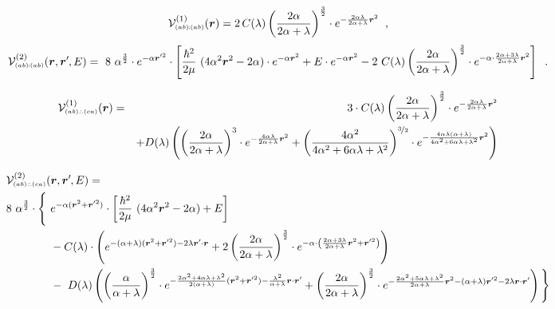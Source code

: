 \documentclass[onecolumn,preprint,superscriptaddress,nofootinbib,notitlepage,10pt,linenumbers]{revtex4-1}
\newcommand*{\mprime}{^{\prime}\mkern-1.2mu}
\newcommand{\la}{\label}
\newcommand{\be}{\begin{equation}}
\newcommand{\ee}{\end{equation}}
\newcommand{\ve}[1]{\ensuremath{\boldsymbol{#1}}}
\newcommand{\cc}{\ensuremath C(\lambda)}
\newcommand{\dd}{\ensuremath D(\lambda)}
\newcommand{\abab}{\ensuremath $(ab)\!\!:\!\!(ab)$}
\newcommand{\abca}{\ensuremath $(ab)\wasytherefore(ca)$}
\begin{document}
\begin{description}
	\item[\abab]
\be\la{eq.local.abab}
\mathcal{V}^{(1)}_{\text{\tiny\abab}}(\ve{r})=
2\,\cc\left(\frac{2\alpha}{2\alpha+\lambda}\right)^{\frac{3}{2}}\cdot
 e^{-\frac{2\alpha\lambda}{2\alpha+\lambda}\ve{r}^2}\;\;,
\ee
\be\la{eq.nonlocal.abab}
\mathcal{V}^{(2)}_{\text{\tiny\abab}}(\ve{r},\ve{r}\mprime,E)=
~8~\alpha^{\frac{3}{2}}\cdot e^{-\alpha\ve{r}\mprime^2}\cdot
\left[\frac{\hbar^2}{2\mu}~(4\alpha^2\ve{r}^2-2\alpha)
\cdot e^{-\alpha\ve{r}^2}+
E\cdot e^{-\alpha\ve{r}^2}
-2~\cc\left(\frac{2\alpha}{2\alpha+\lambda}\right)^{\frac{3}{2}}\cdot
 e^{-\alpha\cdot\frac{2\alpha+3\lambda}{2\alpha+\lambda}\ve{r}^2}\right]\;\;.
\ee

\item[\abca]
\begin{eqnarray}\la{eq.local.abca}
\mathcal{V}^{(1)}_{\text{\tiny\abca}}(\ve{r})&=&
3\cdot \cc\left(\frac{2\alpha}{2\alpha+\lambda}\right)^{\frac{3}{2}}\cdot
 e^{-\frac{2\alpha\lambda}{2\alpha+\lambda}\ve{r}^2}\\
&&+\dd\left(
\left(\frac{2\alpha}{2\alpha+\lambda}\right)^{3}\cdot e^{-\frac{4\alpha\lambda}{2\alpha+\lambda}\ve{r}^2}+
\left(\frac{4\alpha^2}{4\alpha^2+6\alpha\lambda+\lambda^2}\right)^{\nicefrac{3}{2}}\cdot
 e^{-\frac{4\alpha\lambda(\alpha+\lambda)}{4\alpha^2+6\alpha\lambda+\lambda^2}\ve{r}^2}
\right)
\end{eqnarray}


\begin{align}
\multispan2{$\displaystyle \mathcal{V}^{(2)}_{\text{\tiny\abca}}(\ve{r},\ve{r}\mprime,E)=$\hfil}\\
8~\alpha^{\frac{3}{2}}\cdot\Bigg\lbrace&~
e^{-\alpha(\ve{r}^2+\ve{r}\mprime^2)}\cdot
\left[\frac{\hbar^2}{2\mu}~(4\alpha^2\ve{r}^2-2\alpha)+
E\right]\\
&~-\cc\cdot\left(
 e^{-(\alpha+\lambda)(\ve{r}^2+\ve{r}\mprime^2)-2\lambda\ve{r}\mprime\cdot\ve{r}}
+2\left(\frac{2\alpha}{2\alpha+\lambda}\right)^{\frac{3}{2}}\cdot
 e^{-\alpha\cdot\left(\frac{2\alpha+3\lambda}{2\alpha+\lambda}\ve{r}^2+\ve{r}\mprime^2\right)}\right)\\
&~-~\dd\left(\left(\frac{\alpha}{\alpha+\lambda}\right)^{\frac{3}{2}}\cdot
 e^{-\frac{2\alpha^2+4\alpha\lambda+\lambda^2}{2(\alpha+\lambda)}(\ve{r}^2+\ve{r}\mprime^2)-\frac{\lambda^2}{\alpha+\lambda}\ve{r}\cdot\ve{r}\mprime}
+\left(\frac{2\alpha}{2\alpha+\lambda}\right)^{\frac{3}{2}}\cdot
 e^{-\frac{2\alpha^2+5\alpha\lambda+\lambda^2}{2\alpha+\lambda}\ve{r}^2-(\alpha+\lambda)\ve{r}\mprime^2-2\lambda\ve{r}\cdot\ve{r}\mprime}\right)
 \Bigg\rbrace\nonumber\\
 \la{eq.nonlocal.abca}
\end{align}


\end{description}
\end{document}
